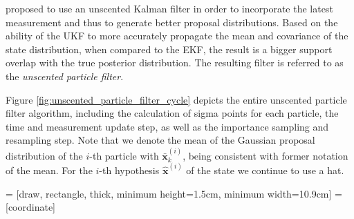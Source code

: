 \citeauthor{van2001unscented} \cite{van2001unscented} proposed to use an unscented Kalman filter in order to incorporate the latest measurement and thus to generate better proposal distributions. Based on the ability of the UKF to more accurately propagate the mean and covariance of the state distribution, when compared to the EKF, the result is a bigger support overlap with the true posterior distribution. The resulting filter is referred to as the \emph{unscented particle filter}.


Figure \ref{fig:unscented_particle_filter_cycle} depicts the entire unscented particle filter algorithm, including the calculation of sigma points for each particle, the time and measurement update step, as well as the importance sampling and resampling step. Note that we denote the mean of the Gaussian proposal distribution of the $i$-th particle with $\bar{\bm{x}}^{(i)}_k$, being consistent with former notation of the mean. For the $i$-th hypothesis $\hat{\bm{x}}^{(i)}$ of the state we continue to use a hat.

 = [draw, rectangle, thick, 
    minimum height=1.5cm, minimum width=10.9cm]
 = [coordinate]

